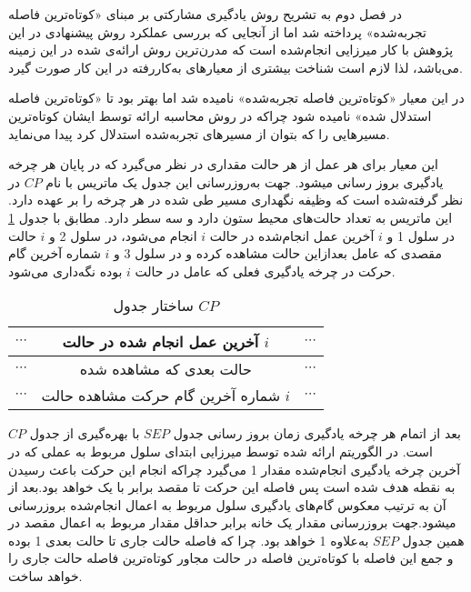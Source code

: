 در فصل دوم به تشریح روش یادگیری مشارکتی بر مبنای «کوتاه‌ترین فاصله تجربه‌شده» پرداخته شد اما از آنجایی که بررسی عملکرد روش پیشنهادی در این پژوهش با کار میرزایی انجام‌شده است که مدرن‌ترین روش ارائه‌ی شده در این زمینه می‌باشد، لذا لازم است شناخت بیشتری از معیارهای به‌کاررفته در این کار صورت گیرد.

در این معیار «کوتاه‌ترین فاصله تجربه‌شده» نامیده شد اما بهتر بود تا «کوتاه‌ترین فاصله استدلال شده» نامیده شود چراکه در روش محاسبه ارائه توسط ایشان کوتاه‌ترین مسیرهایی را که بتوان از مسیرهای تجربه‌شده استدلال کرد پیدا می‌نماید.

این معیار برای هر عمل از هر حالت مقداری در نظر می‌گیرد که در پایان هر چرخه یادگیری بروز رسانی میشود. جهت به‌روزرسانی این جدول یک ماتریس با نام $CP$ در نظر گرفته‌شده است که وظیفه نگهداری مسیر طی شده در هر چرخه را بر عهده دارد. این ماتریس به تعداد حالت‌های محیط ستون دارد و سه سطر دارد. مطابق با جدول \ref{tab:cp} در سلول 1 و $i$ آخرین عمل انجام‌شده در حالت $i$ انجام می‌شود، در سلول 2 و $i$ حالت مقصدی که عامل بعدازاین حالت مشاهده کرده و در سلول 3 و $i$ شماره آخرین گام حرکت در چرخه یادگیری فعلی که عامل در حالت $i$ بوده نگه‌داری می‌شود.

\begin{table}
\centering
\caption{ساختار جدول $CP$}\label{tab:cp}
\begin{tabular}{|c|c|c|}
\hline
$\cdots$ & آخرین عمل انجام شده در حالت $i$ & $\cdots$
\\\hline
$\cdots$ & حالت بعدی که مشاهده شده & $\cdots$
\\\hline
$\cdots$ & شماره آخرین گام حرکت مشاهده حالت $i$ & $\cdots$
\\\hline
\end{tabular}
\end{table}

بعد از اتمام هر چرخه یادگیری زمان بروز رسانی جدول $SEP$ با بهره‌گیری از جدول $CP$ است. در الگوریتم ارائه شده توسط میرزایی ابتدای سلول مربوط به عملی که در آخرین چرخه یادگیری انجام‌شده مقدار 1 می‌گیرد چراکه انجام این حرکت باعث رسیدن به نقطه هدف شده است پس فاصله این حرکت تا مقصد برابر با یک خواهد بود.بعد از آن به ترتیب معکوس گام‌های یادگیری سلول مربوط به اعمال انجام‌شده بروزرسانی میشود.جهت بروزرسانی مقدار یک خانه برابر حداقل مقدار مربوط به اعمال مقصد در همین جدول $SEP$ به‌علاوه 1 خواهد بود. چرا که فاصله حالت جاری تا حالت بعدی 1 بوده و جمع این فاصله با کوتاه‌ترین فاصله در حالت مجاور کوتاه‌ترین فاصله حالت جاری را خواهد ساخت.

